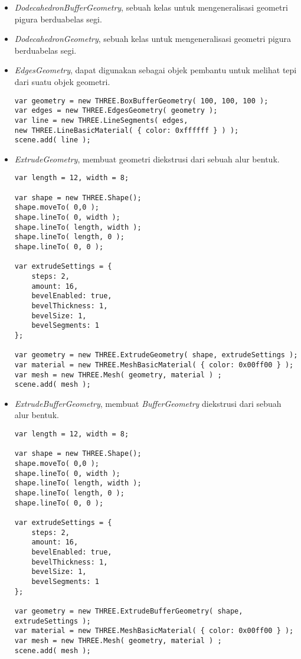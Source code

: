 \begin{itemize}
\begin{itemize}
	\item {\it DodecahedronBufferGeometry}, sebuah kelas untuk mengeneralisasi geometri pigura berduabelas segi.

	\item {\it DodecahedronGeometry}, sebuah kelas untuk mengeneralisasi geometri pigura berduabelas segi.

	\item {\it EdgesGeometry}, dapat digunakan sebagai objek pembantu untuk melihat tepi dari suatu objek geometri.
	
\begin{lstlisting}
var geometry = new THREE.BoxBufferGeometry( 100, 100, 100 );
var edges = new THREE.EdgesGeometry( geometry );
var line = new THREE.LineSegments( edges,
new THREE.LineBasicMaterial( { color: 0xffffff } ) );
scene.add( line );
\end{lstlisting}

	\item {\it ExtrudeGeometry}, membuat geometri diekstrusi dari sebuah alur bentuk.
	
\begin{lstlisting}
var length = 12, width = 8;

var shape = new THREE.Shape();
shape.moveTo( 0,0 );
shape.lineTo( 0, width );
shape.lineTo( length, width );
shape.lineTo( length, 0 );
shape.lineTo( 0, 0 );

var extrudeSettings = {
	steps: 2,
	amount: 16,
	bevelEnabled: true,
	bevelThickness: 1,
	bevelSize: 1,
	bevelSegments: 1
};

var geometry = new THREE.ExtrudeGeometry( shape, extrudeSettings );
var material = new THREE.MeshBasicMaterial( { color: 0x00ff00 } );
var mesh = new THREE.Mesh( geometry, material ) ;
scene.add( mesh );
\end{lstlisting}

	\item {\it ExtrudeBufferGeometry}, membuat {\it BufferGeometry} diekstrusi dari sebuah alur bentuk.
	
\begin{lstlisting}
var length = 12, width = 8;

var shape = new THREE.Shape();
shape.moveTo( 0,0 );
shape.lineTo( 0, width );
shape.lineTo( length, width );
shape.lineTo( length, 0 );
shape.lineTo( 0, 0 );

var extrudeSettings = {
	steps: 2,
	amount: 16,
	bevelEnabled: true,
	bevelThickness: 1,
	bevelSize: 1,
	bevelSegments: 1
};

var geometry = new THREE.ExtrudeBufferGeometry( shape, extrudeSettings );
var material = new THREE.MeshBasicMaterial( { color: 0x00ff00 } );
var mesh = new THREE.Mesh( geometry, material ) ;
scene.add( mesh );
\end{lstlisting}


\end{itemize}
\end{itemize}
